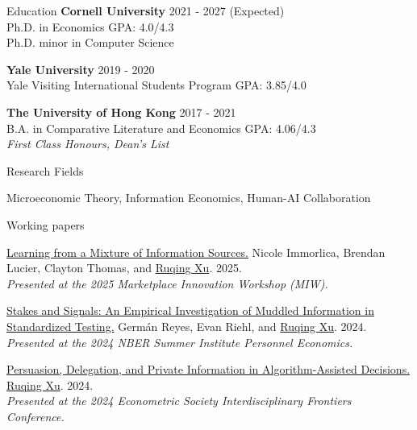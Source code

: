 \documentclass{resume} %
\begin{document}

\begin{rSection}{Education}
{\bf Cornell University} \hfill {2021 - 2027 (Expected)} 
\\ Ph.D. in Economics \hfill {GPA: 4.0/4.3} \\
Ph.D. minor in Computer Science \hfill 

{\bf Yale University} \hfill {2019 - 2020} 
\\ Yale Visiting International Students Program \hfill {GPA: 3.85/4.0}

{\bf The University of Hong Kong} \hfill {2017 - 2021} 
\\ B.A. in Comparative Literature and Economics \hfill {GPA: 4.06/4.3}
\\ \emph{First Class Honours, Dean's List}

\end{rSection}

\begin{rSection}{Research Fields} \itemsep -10pt
\item Microeconomic Theory, Information Economics, Human-AI Collaboration
\end{rSection}

\begin{rSection}{Working papers}

\href{https://ruqing-xu.github.io/assets/pdf/LearningfromMixture.pdf}{Learning from a Mixture of Information Sources.} Nicole Immorlica, Brendan Lucier, Clayton Thomas, and \underline{Ruqing Xu}. 2025.\\
\emph{Presented at the 2025 Marketplace Innovation Workshop (MIW).}

\href{https://ruqing-xu.github.io/assets/pdf/rrx_stakes_june2024.pdf}{Stakes and Signals: An Empirical Investigation of Muddled
Information in Standardized Testing.} Germán Reyes, Evan Riehl, and \underline{Ruqing Xu}. 2024. \\
\emph{Presented at the 2024 NBER Summer Institute Personnel Economics.}

\href{https://ruqing-xu.github.io/assets/pdf/delegation_xu.pdf}{Persuasion, Delegation, and Private Information in Algorithm-Assisted Decisions.} \underline{Ruqing Xu}. 2024. \\
 \emph{Presented at the 2024 Econometric Society Interdisciplinary Frontiers Conference.}


\end{rSection}
\end{document}
